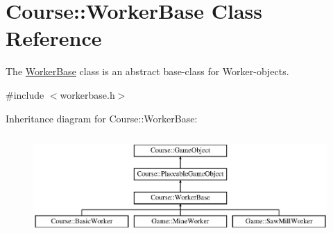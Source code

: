 \hypertarget{classCourse_1_1WorkerBase}{\section{Course\-:\-:Worker\-Base Class Reference}
\label{classCourse_1_1WorkerBase}
}


The \hyperlink{classCourse_1_1WorkerBase}{Worker\-Base} class is an abstract base-\/class for Worker-\/objects.  




{\ttfamily \#include $<$workerbase.\-h$>$}

Inheritance diagram for Course\-:\-:Worker\-Base\-:\begin{figure}[H]
\begin{center}
\leavevmode
\includegraphics[height=3.888889cm]{classCourse_1_1WorkerBase}
\end{center}
\end{figure}
